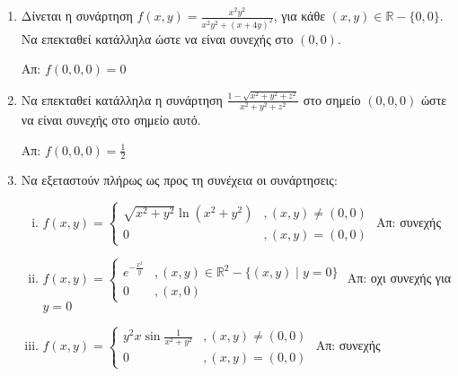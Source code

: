 \begin{enumerate}
  \item Δίνεται η συνάρτηση $f(x,y)=\frac{x^{2}y^{2}}{x^{2}y^{2}+(x+4y)^{2}}$, για κάθε $(x,y)\in \mathbb{R}-\{0,0\}$. Να επεκταθεί κατάλληλα ώστε να είναι συνεχής στο $(0,0)$.

	  \hfill Απ: $ f(0,0,0) = 0 $

  \item Να επεκταθεί κατάλληλα η συνάρτηση $ \frac{ 1 - \sqrt{ x^{2}+y^{2}+z^{2} } }{
	  x^{2}+y^{2}+z^{2}} $ στο σημείο $ (0,0,0) $ ώστε να είναι συνεχής στο σημείο αυτό.

		  \hfill Απ: $ f(0,0,0)= \frac{ 1 }{ 2 } $

  \item Να εξεταστούν πλήρως ως προς τη συνέχεια οι συνάρτησεις:
	  \begin{enumerate}[i)]
		  \item   \(
			  f(x,y) = \begin{cases}
				  \sqrt{x^{2}+y^{2}}\ln(x^{2}+y^{2}) &, (x,y)\neq (0,0) \\
				  0 &, (x,y)=(0,0)
			  \end{cases}
      \) \hfill Απ: συνεχής
      \item   \(
        f(x,y)=\begin{cases}
          e^{-\frac{x^{2}}{y}} &, (x,y)\in\mathbb{R}^{2}-\{(x,y)\mid y=0\} \\
          0 &, (x,0)
      \end{cases}
        \) \hfill Απ: οχι συνεχής για $y=0$
        \item   \(
          f(x,y)=\begin{cases}
            y^{2}x\sin \frac{1}{x^{2}+y^{2}} &, (x,y)\neq (0,0)\\
            0 &, (x,y)=(0,0)
        \end{cases}
          \) \hfill Απ: συνεχής
  \end{enumerate}
\end{enumerate}


